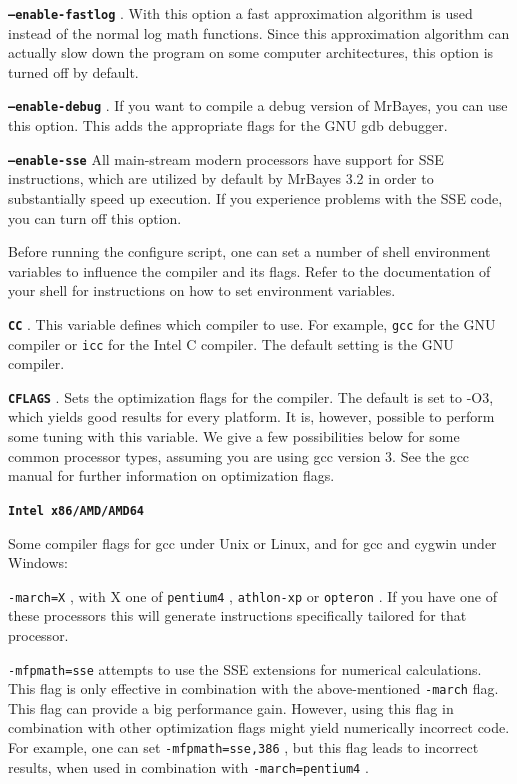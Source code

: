 \documentclass[12pt]{book}
\newcommand{\ttt}[1]{\texttt{#1} }
\newcommand{\tb}[1]{\ttt{\textbf{#1}} }
\begin{document}
\tb{--enable-fastlog}. With this option a fast approximation algorithm is used instead of the
normal log  math functions. Since this approximation algorithm can actually slow down the program
on some computer architectures, this option is turned off by default. 

\tb{--enable-debug}. If you want to compile a debug version of MrBayes, you can use this option.
This adds the appropriate flags for the GNU gdb debugger. 

\tb{--enable-sse}    All main-stream modern processors have support for SSE instructions, which are
utilized by default by MrBayes 3.2 in order to substantially speed up execution. If you experience
problems with the SSE code, you can turn off this option.

Before running the configure script, one can set a number of shell environment variables to
influence the compiler and its flags. Refer to the documentation of your shell for instructions on
how to set environment variables.

\tb{CC}. This variable defines which compiler to use. For example, \ttt{gcc} for the GNU compiler
or \ttt{icc} for the Intel C compiler. The default setting is the GNU compiler.

\tb{CFLAGS}. Sets the optimization flags for the compiler. The default is set to -O3, which yields
good results for every platform. It is, however, possible to perform some tuning with this
variable. We give a few possibilities below for some common processor types, assuming you are using
gcc version 3. See the gcc manual for further information on optimization flags.

\tb{{Intel x86/AMD/AMD64}} 

Some compiler flags for gcc under Unix or Linux, and for gcc and cygwin under Windows:

\ttt{-march=X}, with X one of \ttt{pentium4}, \ttt{athlon-xp} or \ttt{opteron}.  If you have one of
these processors this will generate instructions specifically tailored for that processor.

\ttt{-mfpmath=sse} attempts to use the SSE extensions for numerical calculations. This flag is only
effective in combination with the above-mentioned \ttt{-march} flag. This flag can provide a big
performance gain. However, using this flag in combination with other optimization flags might yield
numerically incorrect code. For example, one can set \ttt{-mfpmath=sse,386}, but this flag leads to
incorrect results, when used in combination with \ttt{-march=pentium4}. 
 
\end{document}
